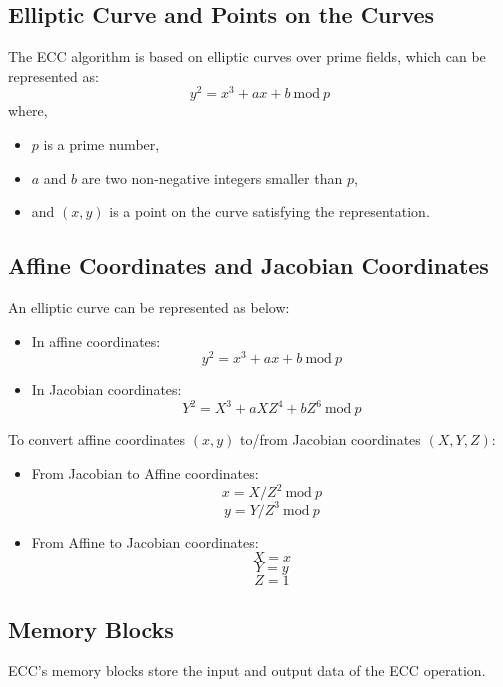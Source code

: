\documentclass[main\_\_EN.tex]{subfiles}
\begin{document}
\subsection{Elliptic Curve and Points on the Curves}

The ECC algorithm is based on elliptic curves over prime fields, which can be represented as:
\[
{y}^{2} = {x}^{3} + {ax} + b \ \textrm{mod}\ p
\]
where,
\begin{itemize}
    \item $p$ is a prime number,
    \item $a$ and $b$ are two non-negative integers smaller than $p$,
    \item and $(x, y)$ is a point on the curve satisfying the representation.
\end{itemize}


\subsection{Affine Coordinates and Jacobian Coordinates}

An elliptic curve can be represented as below:

\begin{itemize}
    \item In affine coordinates:
    \[
    {y}^{2} = {x}^{3} + {ax} + b \ \textrm{mod}\ p
    \]
    \item In Jacobian coordinates:
    \[
    {Y}^{2} = {X}^{3} + {aXZ}^{4} + {bZ}^{6} \ \textrm{mod}\ p
    \]
\end{itemize}

To convert affine coordinates $(x,y)$ to/from Jacobian coordinates $(X,Y,Z)$:

\begin{itemize}
    \item From Jacobian to Affine coordinates:
    \[
    x = X / {Z}^2 \ \textrm{mod}\ p
    \]
    \[
    y = Y / {Z}^3 \ \textrm{mod}\ p
    \]
    \item From Affine to Jacobian coordinates:
    \[ X = x \]
    \[ Y = y \]
    \[ Z = 1\]
\end{itemize}

\subsection{Memory Blocks}

ECC's memory blocks store the input and output data of the ECC operation.
\end{document}
